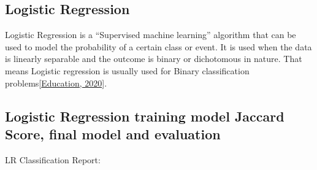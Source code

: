 \documentclass[letterpaper,10pt,english]{jupyterBook}
\begin{document}
\subsection{Logistic Regression}
\label{\detokenize{analysis:logistic-regression}}
\sphinxAtStartPar
Logistic Regression is a “Supervised machine learning” algorithm that can be used to model the probability of a certain class or event. It is used when the data is linearly separable and the outcome is binary or dichotomous in nature. That means Logistic regression is usually used for Binary classification problems{[}\hyperlink{cite.references:id7}{Education, 2020}{]}.


\subsection{Logistic Regression training model Jaccard Score, final model and evaluation}
\label{\detokenize{analysis:logistic-regression-training-model-jaccard-score-final-model-and-evaluation}}
\sphinxAtStartPar
LR Classification Report:
\end{document}

